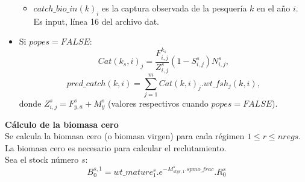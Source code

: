 \documentclass{article}
\begin{document}
\begin{itemize}
\begin{itemize}
        \item $catch\_bio\_in(k)_i$ es la captura observada de la pesquería $k$ en el año $i$. Es input, línea 16 del archivo dat. 
 
\end{itemize}
    \item Si $popes=FALSE$:
     \begin{equation}
        Cat(k_s,i)_j=\dfrac{F^{k_s}_{i,j}}{Z^s_{i,j}}\left(1-S^s_{i,j}\right)N^s_{i,j},
    \end{equation}
      \begin{equation}
        pred\_catch(k,i)=\sum_{j=1}^{m}Cat(k,i)_j.wt\_fsh_j(k,i),
    \end{equation}
        donde $Z^s_{i,j}=F^s_{y,a}+M^{s}_{y}$ 
 (valores respectivos cuando $popes=FALSE$).
        
    
\end{itemize}
\textbf{Cálculo de la biomasa cero}\\
Se calcula la biomasa cero (o biomasa virgen) para cada régimen $1\leq r \leq nregs$. La biomasa cero es necesario para calcular el reclutamiento.\\
Sea el stock número $s$:
\begin{equation}
    B^{s,1}_0=wt\_mature^s_1.e^{-M^s_{styr,1}.spmo\_frac}.R^s_0
\end{equation}
\end{document}
